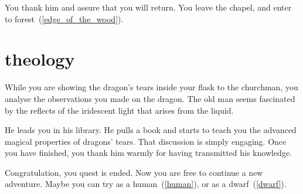 You thank him and assure that you will return. You leave the chapel, and enter
to forest~(\ref{edge_of_the_wood}).

\section{theology}

While you are showing the dragon's tears inside your flask to the churchman, you
analyse the observations you made on the dragon. The old man seems fascinated by
the reflects of the iridescent light that arises from the liquid.

He leads you in his library. He pulls a book and starts to teach you the advanced
magical properties of dragons' tears. That discussion is simply engaging.
Once you have finished, you thank him warmly for having transmitted his
knowledge.

Congratulation, you quest is ended. Now you are free to continue a new
adventure. Maybe you can try as a human~(\ref{human}), or as a
dwarf~(\ref{dwarf}).
